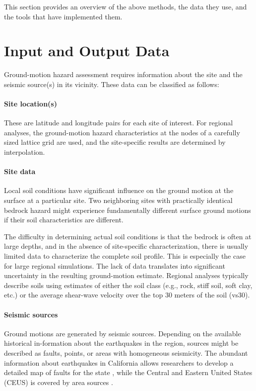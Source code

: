 This section provides an overview of the above methods, the data they use, and the tools that have implemented them.

\section{Input and Output Data}
\label{sec:eq_shake_io}

Ground-motion hazard assessment requires information about the site and the seismic source(s) in its vicinity. These data can be classified as follows:

\paragraph{Site location(s)} These are latitude and longitude pairs for each site of interest. For regional analyses, the ground-motion hazard characteristics at the nodes of a carefully sized lattice grid are used, and the site-specific results are determined by interpolation.

\paragraph{Site data} Local soil conditions have significant influence on the ground motion at the surface at a particular site. Two neighboring sites with practically identical bedrock hazard might experience fundamentally different surface ground motions if their soil characteristics are different. 

The difficulty in determining actual soil conditions is that the bedrock is often at large depths, and in the absence of site-specific characterization, there is usually limited data to characterize the complete soil profile. This is especially the case for large regional simulations. The lack of data translates into significant uncertainty in the resulting ground-motion estimate. Regional analyses typically describe soils using estimates of either the soil class (e.g., rock, stiff soil, soft clay, etc.) or the average shear-wave velocity over the top 30 meters of the soil (vs30). 

\paragraph{Seismic sources} Ground motions are generated by seismic sources. Depending on the available historical in-formation about the earthquakes in the region, sources might be described as faults, points, or areas with homogeneous seismicity. The abundant information about earthquakes in California allows researchers to develop a detailed map of faults for the state \citep{field2014uniform}, while the Central and Eastern United States (CEUS) is covered by area sources \citep{mueller2015seismic}.

